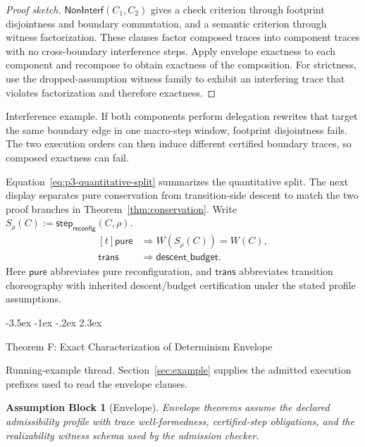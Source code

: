 \documentclass[a4paper,10pt,twocolumn,english]{article}
\makeatletter
\renewcommand{\section}{\@startsection{section}{1}{\z@}%
  {-3.5ex \@plus -1ex \@minus -.2ex}%
  {2.3ex}%
  {\raggedright\normalfont\large\bfseries}}
\numberwithin{equation}{section}
\theoremstyle{paperdef}
\theoremstyle{paperplain}
\theoremstyle{paperdef}
\theoremstyle{paperremark}
\theoremstyle{paperdef}
\newtheorem{assumptions}[assumption]{Assumption Block}
\makeatother
\begin{document}
\begin{proof}[Proof sketch]
	$\mathsf{NonInterf}(C_1,C_2)$ gives a check criterion through footprint disjointness and boundary commutation, and a semantic criterion through witness factorization. These clauses factor composed traces into component traces with no cross-boundary interference steps. Apply envelope exactness to each component and recompose to obtain exactness of the composition. For strictness, use the dropped-assumption witness family to exhibit an interfering trace that violates factorization and therefore exactness.
\end{proof}

Interference example. If both components perform delegation rewrites that target the same boundary edge in one macro-step window, footprint disjointness fails. The two execution orders can then induce different certified boundary traces, so composed exactness can fail.

Equation~\ref{eq:p3-quantitative-split} summarizes the quantitative split.
The next display separates pure conservation from transition-side descent to
match the two proof branches in Theorem~\ref{thm:conservation}.
Write $S_\rho(C):=\mathsf{step}_{\mathsf{reconfig}}(C,\rho)$.
\begin{equation}
	\label{eq:p3-quantitative-split}
	\begin{aligned}[t]
		\mathsf{pure}  & \Rightarrow W(S_\rho(C)) = W(C),      \\
		\mathsf{trans} & \Rightarrow \mathsf{descent\_budget}.
	\end{aligned}
\end{equation}
Here $\mathsf{pure}$ abbreviates pure reconfiguration, and $\mathsf{trans}$ abbreviates transition choreography with inherited descent/budget certification under the stated profile assumptions.

\section{Theorem F: Exact Characterization of Determinism Envelope}
\label{sec:theorem-f}

Running-example thread. Section~\ref{sec:example} supplies the admitted
execution prefixes used to read the envelope clauses.

\begin{assumptions}[Envelope]
	\label{assump:p3-envelope}
	Envelope theorems assume the declared admissibility profile with trace well-formedness, certified-step obligations, and the realizability witness schema used by the admission checker.
\end{assumptions}
\end{document}
